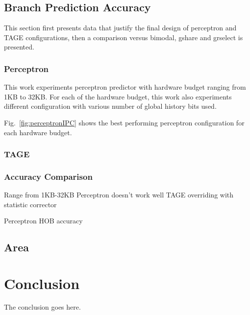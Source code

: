 \documentclass[conference]{IEEEtran}
\begin{document}
\subsection{Branch Prediction Accuracy}
\label{sec:eval:ipc}
This section first presents data that justify the final design of perceptron and TAGE configurations, then a comparison versus bimodal, gshare and grselect is presented.

\subsubsection{Perceptron}
\label{sec:eval:ipc:perceptron}
This work experiments perceptron predictor with hardware budget ranging from 1KB to 32KB. For each of the hardware budget, this work also experiments different configuration with various number of global history bits used.

Fig.~\ref{fig:perceptronIPC} shows the best performing perceptron configuration for each hardware budget. 



\subsubsection{TAGE}
\label{sec:eval:ipc:tage}



\subsubsection{Accuracy Comparison}
Range from 1KB-32KB
Perceptron doesn't work well
TAGE overriding with statistic corrector



Perceptron HOB accuracy

\subsection{Area}
\label{sec:eval:area}



\section{Conclusion}
The conclusion goes here.












\end{document}
